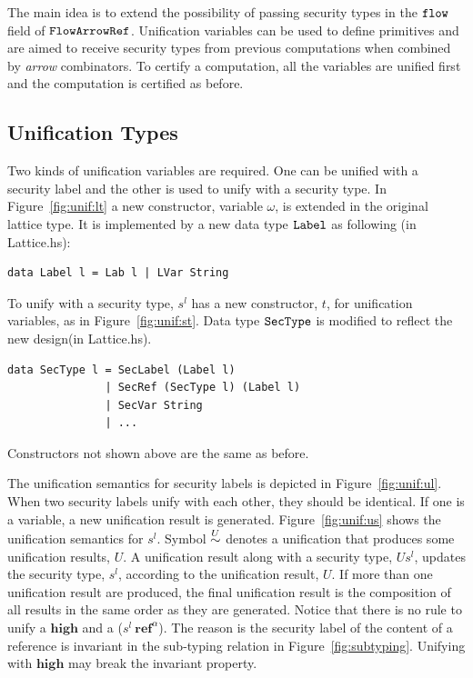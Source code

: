 \documentclass[a4paper]{report}
\newcommand{\co}[1]{$\cod{#1}$}
\newcommand{\st}{s^l}
\begin{document}
The main idea is to extend the possibility of passing security types in the \co{flow} field 
of \co{FlowArrowRef}. Unification variables can be used to define primitives and are aimed to
receive security types from previous computations when combined by {\em arrow} combinators.
To certify a computation, all the variables are unified first and the computation is 
certified as before.

\subsection{Unification Types}
\label{chap5:unificationType}
Two kinds of unification variables are required. One can be unified with a security label and the other
is used to unify with a security type. In Figure~\ref{fig:unif:lt} a new constructor, variable $\omega$,
is extended in the original lattice type. It is implemented by a new data type \co{Label} as following
(in Lattice.hs):
\begin{Verbatim}[fontsize=\footnotesize]
data Label l = Lab l | LVar String
\end{Verbatim}
To unify with a security type, $\st$ has a new constructor, $t$, for unification variables, as in 
Figure~\ref{fig:unif:st}. Data type \co{SecType} is modified to reflect the new design(in Lattice.hs).
\begin{Verbatim}[fontsize=\footnotesize]
data SecType l = SecLabel (Label l) 
               | SecRef (SecType l) (Label l)
               | SecVar String
               | ...
\end{Verbatim}
Constructors not shown above are the same as before.

The unification semantics for security labels is depicted in Figure~\ref{fig:unif:ul}. When two security labels
unify with each other, they should be identical. If one is a variable, a new unification
result is generated. Figure~\ref{fig:unif:us} shows the unification semantics for $\st$. 
Symbol $\stackrel{{U}}{\sim}$ denotes a unification that produces some unification results, $U$. A unification
result along with a security type, $U\st$, updates the security type, $\st$, according to the unification
result, $U$. If more than one unification result are produced, the final unification result is the 
composition of all results in the same order as they are generated. Notice that there is no rule to
unify a $\mathbf{high}$ and a ($\st~\mathbf{ref}^\alpha$). The reason is the security label of the content
of a reference is invariant in the sub-typing relation in Figure~\ref{fig:subtyping}. Unifying with
$\mathbf{high}$ may break the invariant property.
\end{document}
